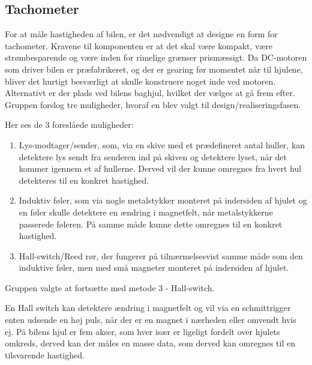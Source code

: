 \subsection{Tachometer}

For at måle hastigheden af bilen, er det nødvendigt at designe en form for tachometer. Kravene til komponenten er at det skal være kompakt, være strømbesparende og være inden for rimelige grænser prismæssigt. Da DC-motoren som driver bilen er præfabrikeret, og der er gearing før momentet når til hjulene, bliver det hurtigt besværligt at skulle konstruere noget inde ved motoren. Alternativt er der plads ved bilens baghjul, hvilket der vælges at gå frem efter. Gruppen forslog tre muligheder, hvoraf en blev valgt til design/realiseringsfasen.

Her ses de 3 foreslåede muligheder:

\begin{enumerate}
	\item Lys-modtager/sender, som, via en skive med et prædefineret antal huller, kan detektere lys sendt fra senderen ind på skiven og detektere lyset, når det kommer igennem et af hullerne. Derved vil der kunne omregnes fra hvert hul detekteres til en konkret hastighed.
	\item Induktiv føler, som via nogle metalstykker monteret på indersiden af hjulet og en føler skulle detektere en ændring i magnetfelt, når metalstykkerne passerede føleren. På samme måde kunne dette omregnes til en konkret hastighed.
	\item Hall-switch/Reed rør, der fungerer på tilnærmelsesvist samme måde som den induktive føler, men med små magneter monteret på indersiden af hjulet. 
\end{enumerate}

Gruppen valgte at fortsætte med metode 3 - Hall-switch. 

En Hall switch kan detektere ændring i magnetfelt og vil via en schmittrigger enten udsende en høj puls, når der er en magnet i nærheden eller omvendt hvis ej. På bilens hjul er fem akser, som hver især er ligeligt fordelt over hjulets omkreds, derved kan der måles en masse data, som derved kan omregnes til en tilsvarende hastighed. 